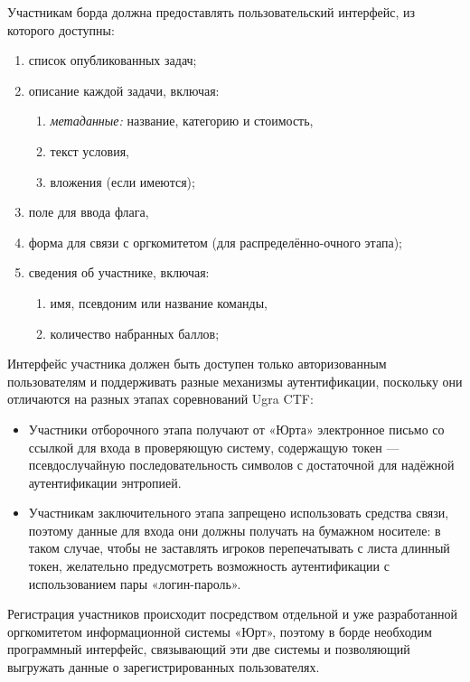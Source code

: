 Участникам борда должна предоставлять пользовательский интерфейс, из которого доступны:
\begin{enumerate}
\item список опубликованных задач;
\item описание каждой задачи, включая:
  \begin{enumerate}
  \item \textit{метаданные:} название, категорию и стоимость,
  \item текст условия,
  \item вложения (если имеются);
  \end{enumerate}
\item поле для ввода флага,
\item форма для связи с оргкомитетом (для распределённо-очного этапа);
\item сведения об участнике, включая:
  \begin{enumerate}
  \item имя, псевдоним или название команды,
  \item количество набранных баллов;
  \end{enumerate}
\end{enumerate}

Интерфейс участника должен быть доступен только авторизованным пользователям и поддерживать разные механизмы аутентификации, поскольку они отличаются на разных этапах соревнований Ugra CTF:

\begin{itemize}
\item
  Участники отборочного этапа получают от «Юрта» электронное письмо со ссылкой для входа в проверяющую систему, содержащую токен — псевдослучайную последовательность символов с достаточной для надёжной аутентификации энтропией.
\item
  Участникам заключительного этапа запрещено использовать средства связи, поэтому данные для входа они должны получать на бумажном носителе: в таком случае, чтобы не заставлять игроков перепечатывать с листа длинный токен, желательно предусмотреть возможность аутентификации с использованием пары «логин-пароль».
\end{itemize}


Регистрация участников происходит посредством отдельной и уже разработанной оргкомитетом информационной системы «Юрт», поэтому в борде необходим программный интерфейс, связывающий эти две системы и позволяющий выгружать данные о зарегистрированных пользователях.


